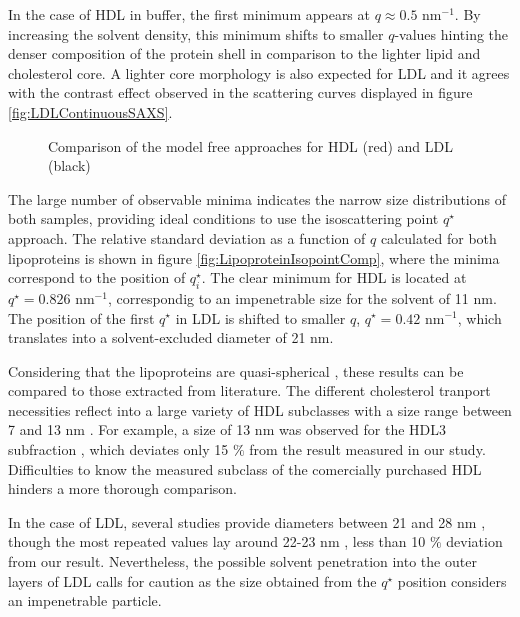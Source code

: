 In the case of HDL in buffer, the first minimum appears at $q\approx0.5$ nm$^{-1}$. By increasing the solvent density, this minimum shifts to smaller $q$-values hinting the denser composition of the protein shell in comparison to the lighter lipid and cholesterol core. A lighter core morphology is also expected for LDL \citep{luzzati_structure_1979} and it agrees with the contrast effect observed in the scattering curves displayed in figure \ref{fig:LDLContinuousSAXS}.

\begin{figure}
	\centering
		\caption[Model free-approaches to the experimental data of HDL and LDL.]{Comparison of the model free approaches for HDL (red) and LDL (black)}
\end{figure}

The large number of observable minima indicates the narrow size distributions of both samples, providing ideal conditions to use the isoscattering point $q^{\star}$ approach. The relative standard deviation as a function of $q$ calculated for both lipoproteins is shown in figure \ref{fig:LipoproteinIsopointComp}, where the minima correspond to the position of $q^{\star}_i$. The clear minimum for HDL is located at $q^{\star}=0.826$ nm$^{-1}$, correspondig to an impenetrable size for the solvent of 11 nm. The position of the first $q^{\star}$ in LDL is shifted to smaller $q$, $q^{\star}=0.42$ nm$^{-1}$, which translates into a solvent-excluded diameter of 21 nm.

Considering that the lipoproteins are quasi-spherical \citep{stuhrmann_neutron_1975}, these results can be compared to those extracted from literature. The different cholesterol tranport necessities reflect into a large variety of HDL subclasses with a size range between 7 and 13 nm \citep{german_lipoproteins:_2006}. For example, a size of 13 nm was observed for the HDL3 subfraction \citep{tardieu_structure_1976}, which deviates only 15 $\%$ from the result measured in our study. Difficulties to know the measured subclass of the comercially purchased HDL hinders a more thorough comparison.

In the case of LDL, several studies provide diameters between 21 and 28 nm \citep{tardieu_structure_1976,colhoun_lipoprotein_2002,german_lipoproteins:_2006}, though the most repeated values lay around 22-23 nm \citep{muller_structure_1978,luzzati_structure_1979}, less than 10 $\%$ deviation from our result. Nevertheless, the possible solvent penetration into the outer layers of LDL \citep{stuhrmann_neutron_1975,tardieu_structure_1976} calls for caution as the size obtained from the $q^{\star}$ position considers an impenetrable particle.

